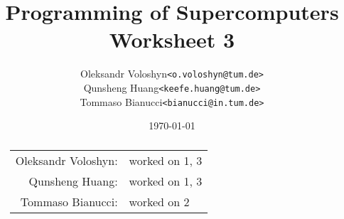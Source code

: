 \documentclass{article}
\title{Programming of Supercomputers\\Worksheet 3}
\author{
	\begin{tabular}{rl}
		Oleksandr Voloshyn& \texttt{<o.voloshyn@tum.de>}\\ 
		Qunsheng Huang& \texttt{<keefe.huang@tum.de>}\\ 
		Tommaso Bianucci& \texttt{<bianucci@in.tum.de>}
	\end{tabular}
}
\date{\today}
\begin{document}
\maketitle
\renewcommand{\abstractname}{Group members's contributions}
\begin{abstract}
	\begin{center}
		\begin{tabular}{rl}
		Oleksandr Voloshyn:& worked on 1, 3\\
		Qunsheng Huang:& worked on 1, 3\\
		Tommaso Bianucci:& worked on 2
		\end{tabular}
	\end{center}
\end{abstract}


\end{document}

